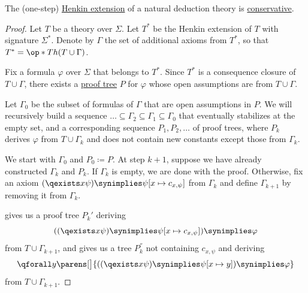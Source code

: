 \begin{proposition}\label{thm:fol_henkin_extension_is_conservative}
  The (one-step) \hyperref[def:fol_henkin_extension]{Henkin extension} of a natural deduction theory is \hyperref[def:fol_theory/conservative]{conservative}.
\end{proposition}
\begin{proof}
  Let \( T \) be a theory over \( \Sigma \). Let \( T^* \) be the Henkin extension of \( T \) with signature \( \Sigma^* \). Denote by \( \Gamma \) the set of additional axioms from \( T^* \), so that \( T^* = \op*{Th}(T \cup \Gamma) \).

  Fix a formula \( \varphi \) over \( \Sigma \) that belongs to \( T^* \). Since \( T^* \) is a consequence closure of \( T \cup \Gamma \), there exists a \hyperref[def:fol_natural_deduction_proof_tree]{proof tree} \( P \) for \( \varphi \) whose open assumptions are from \( T \cup \Gamma \).

  Let \( \Gamma_0 \) be the subset of formulas of \( \Gamma \) that are open assumptions in \( P \). We will recursively build a sequence \( \ldots \subseteq \Gamma_2 \subseteq \Gamma_1 \subseteq \Gamma_0 \) that eventually stabilizes at the empty set, and a corresponding sequence \( P_1, P_2, \ldots \) of proof trees, where \( P_k \) derives \( \varphi \) from \( T \cup \Gamma_k \) and does not contain new constants except those from \( \Gamma_k \).

  We start with \( \Gamma_0 \) and \( P_0 \coloneqq P \). At step \( k + 1 \), suppose we have already constructed \( \Gamma_k \) and \( P_k \). If \( \Gamma_k \) is empty, we are done with the proof. Otherwise, fix an axiom \( (\qexists x \psi) \synimplies \psi[x \mapsto c_{x,\psi}] \) from \( \Gamma_k \) and define \( \Gamma_{k+1} \) by removing it from \( \Gamma_k \).

   gives us a proof tree \( P_k' \) deriving
  \begin{equation*}
    ((\qexists x \psi) \synimplies \psi[x \mapsto c_{x,\psi}]) \synimplies \varphi
  \end{equation*}
  from \( T \cup \Gamma_{k+1} \), and  gives us a tree \( P_k^\dprime \) not containing \( c_{x,\psi} \) and deriving
  \begin{equation*}
    \qforall y \parens[\big]{ ((\qexists x \psi) \synimplies \psi[x \mapsto y]) \synimplies \varphi }
  \end{equation*}
  from \( T \cup \Gamma_{k+1} \).


\end{proof}
